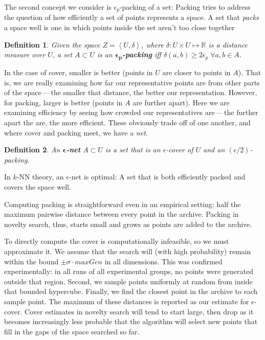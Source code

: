 \documentclass[twoside]{article}
\newtheorem{definition}{Definition}
\newcommand{\IR}{\mathbb{R}}
\begin{document}
The second concept we consider is $\epsilon_p$-packing of a set:  Packing tries to address the question of how efficiently a set of points represents a space.  A set that \emph{packs} a space well is one in which points inside the set aren't too close together

\begin{definition}
Given the space $Z=\left\langle U, \delta\right\rangle$, where $\delta: U\times U \mapsto \IR$ is a distance measure over $U$, a set $A\subset U$ is an $\boldsymbol{\epsilon_p}$\textbf{-packing} iff $\delta(a,b) \geq 2\epsilon_p \; \forall a,b \in A$. 
\end{definition}

In the case of cover, smaller is better (points in $U$ are closer to points in $A$).  That is, we are really examining how far our representative points are from other parts of the space\,---\,the smaller that distance, the better our representation.  However, for packing, larger is better (points in $A$ are further apart).  Here we are examining efficiency by seeing how crowded our representatives are\,---\,the further apart the are, the more efficient.  These obviously trade off of one another, and where cover and packing meet, we have a \emph{net}.  

\begin{definition}
An $\boldsymbol{\epsilon}$\textbf{-net} $A \subset U$ is a set that is an $\epsilon$-cover of $U$ and an $(\epsilon/2)$-packing.
\end{definition}
%
In $k$-NN theory, an $\epsilon$-net is optimal:  A set that is both efficiently packed and covers the space well.

Computing packing is straightforward even in an empirical setting:  half the maximum pairwise distance between every point in the archive.  Packing in novelty search, thus, starts small and grows as points are added to the archive. 

To directly compute the cover is computationally infeasible, so we must approximate it.  We assume that the search will (with high probability) remain within the bound $\pm\sigma\cdot maxGen$ in all dimensions.  This was confirmed experimentally:  in all runs of all experimental groups, no points were generated outside that region.  Second, we sample points uniformly at random from inside that bounded hypercube.  Finally, we find the closest point in the archive to each sample point. The maximum of these distances is reported as our estimate for $\epsilon$-cover.  Cover estimates in novelty search will tend to start large, then drop as it becomes increasingly less probable that the algorithm will select new points that fill in the gaps of the space searched so far.
\end{document}
